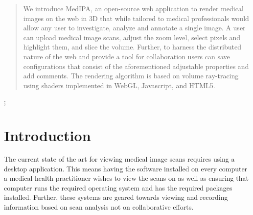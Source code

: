 \documentclass[annual]{acmsiggraph}
\begin{document}
\begin{abstract}
We introduce MedIPA, an open-source web application to render medical images on the web in 3D that while tailored to medical professionals would allow any user to investigate, analyze and annotate a single image.  A user can upload medical image scans, adjust the zoom level, select pixels and highlight them, and slice the volume.  Further, to harness the distributed nature of the web and provide a tool for collaboration users can save configurations that consist of the aforementioned adjustable properties and add comments. The rendering algorithm is based on volume ray-tracing using shaders implemented in WebGL, Javascript, and HTML5.
\end{abstract}

\begin{CRcatlist}
  ;
\end{CRcatlist}


\keywordlist


\TOGlinkslist


\copyrightspace


\section{Introduction}
The current state of the art for viewing medical image scans requires using a desktop application.  This means having the software installed on every computer a medical health practitioner wishes to view the scans on as well as ensuring that computer runs the required operating system and has the required packages installed.  Further, these systems are geared towards viewing and recording information based on scan analysis not on collaborative efforts.
\end{document}
